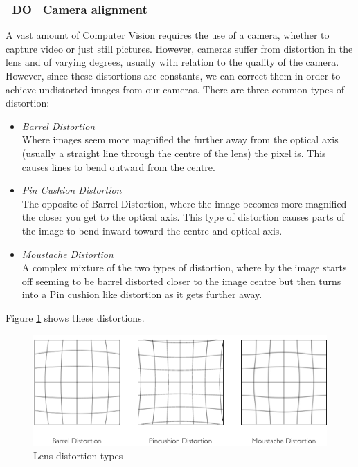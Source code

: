 \documentclass[11pt]{article}
\begin{document}
\subsubsection{~DO~ Camera alignment}
A vast amount of Computer Vision requires the use of a camera, whether to 
capture video or just still pictures. However, cameras suffer from distortion
in the lens and of varying degrees, usually with relation to the quality
of the camera. However, since these distortions are constants, we can
correct them in order to achieve undistorted images from our cameras.
There are three common types of distortion:
\begin{itemize}
	\item \textit{Barrel Distortion} \\
			Where images seem more magnified the further away from the optical
			axis (usually a straight line through the centre of the lens) 
			the pixel is. This causes lines to bend outward from the centre.
	\item \textit{Pin Cushion Distortion} \\
			The opposite of Barrel Distortion, where the image becomes more 
			magnified the closer you get to the optical axis. This type of
			distortion causes parts of the image to bend inward toward the 
			centre and optical axis.
	\item \textit{Moustache Distortion} \\
			A complex mixture of the two types of distortion, where by the 
			image starts off seeming to be barrel distorted closer to the
			image centre but then turns into a Pin cushion like distortion
			as it gets further away.
\end{itemize}

Figure \ref{fig:distortions} shows these distortions.

\begin{figure}
	\centering
	\includegraphics[scale=0.8]{pics/distortions.png}
	\caption{Lens distortion types}
	\label{fig:distortions}
\end{figure}
\end{document}
